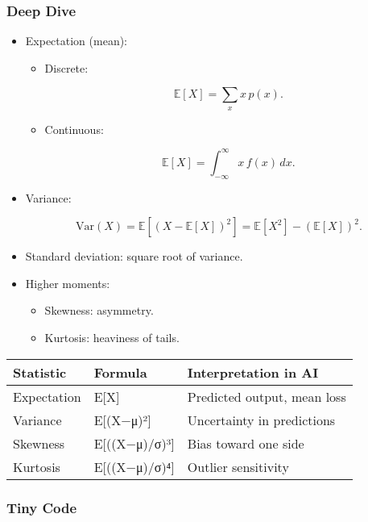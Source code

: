 \documentclass[
  letterpaper,
  DIV=11,
  numbers=noendperiod]{scrreprt}
\providecommand{\tightlist}{%
  \setlength{\itemsep}{0pt}\setlength{\parskip}{0pt}}
\begin{document}
\subsubsection{Deep Dive}\label{deep-dive-122}

\begin{itemize}
\item
  Expectation (mean):

  \begin{itemize}
  \item
    Discrete:

    \[
    \mathbb{E}[X] = \sum_x x \, p(x).
    \]
  \item
    Continuous:

    \[
    \mathbb{E}[X] = \int_{-\infty}^\infty x \, f(x) \, dx.
    \]
  \end{itemize}
\item
  Variance:

  \[
  \text{Var}(X) = \mathbb{E}[(X - \mathbb{E}[X])^2] = \mathbb{E}[X^2] - (\mathbb{E}[X])^2.
  \]
\item
  Standard deviation: square root of variance.
\item
  Higher moments:

  \begin{itemize}
  \tightlist
  \item
    Skewness: asymmetry.
  \item
    Kurtosis: heaviness of tails.
  \end{itemize}
\end{itemize}

\begin{longtable}[]{@{}lll@{}}
\toprule\noalign{}
Statistic & Formula & Interpretation in AI \\
\midrule\noalign{}
\endhead
\bottomrule\noalign{}
\endlastfoot
Expectation & E{[}X{]} & Predicted output, mean loss \\
Variance & E{[}(X−μ)²{]} & Uncertainty in predictions \\
Skewness & E{[}((X−μ)/σ)³{]} & Bias toward one side \\
Kurtosis & E{[}((X−μ)/σ)⁴{]} & Outlier sensitivity \\
\end{longtable}

\subsubsection{Tiny Code}\label{tiny-code-122}
\end{document}
